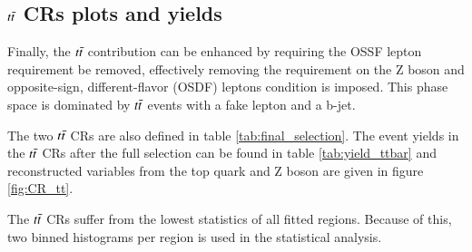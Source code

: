\subsection{$t\Bar{t}$ CRs plots and yields}
\label{subsec:tt_plot_yield}

Finally, the $t\Bar{t}$ contribution can be enhanced by requiring the OSSF lepton requirement be removed, effectively removing the requirement on the Z boson and opposite-sign, different-flavor (OSDF) leptons condition is imposed. This phase space is dominated by $t\Bar{t}$ events with a fake lepton and a b-jet. 

The two $t\Bar{t}$ CRs are also defined in table \ref{tab:final_selection}. The event yields in the $t\Bar{t}$ CRs after the full selection can be found in table \ref{tab:yield_ttbar} and reconstructed variables from the top quark and Z boson are given in figure \ref{fig:CR_tt}.

The $t\Bar{t}$ CRs suffer from the lowest statistics of all fitted regions. Because of this, two binned histograms per region is used in the statistical analysis.

